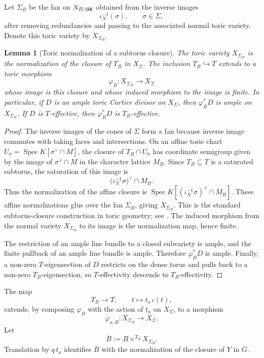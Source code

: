 \documentclass[10pt,a4paper]{amsart}
\theoremstyle{plain}
\newtheorem{lemma}[theorem]{Lemma}
\theoremstyle{plain}
\numberwithin{equation}{section}
\begin{document}
Let \(\Sigma_B\) be the fan on \(N_{B,\BR}\) obtained from the inverse images
\[
\iota_N^{-1}(\sigma),\qquad \sigma\in\Sigma,
\]
after removing redundancies and passing to the associated normal toric
variety.  Denote this toric variety by \(X_{\Sigma_B}\).

\begin{lemma}[Toric normalization of a subtorus closure]
	\label{lem:subtorus-toric-normalization}
	The toric variety \(X_{\Sigma_B}\) is the normalization of the closure of
	\(T_B\) in \(X_\Sigma\).  The inclusion \(T_B\hookrightarrow T\) extends to a
	toric morphism
	\[
	\varphi_B:X_{\Sigma_B}\longrightarrow X_\Sigma
	\]
	whose image is this closure and whose induced morphism to the image is finite.
	In particular, if \(D\) is an ample toric Cartier divisor on \(X_\Sigma\), then
	\(\varphi_B^*D\) is ample on \(X_{\Sigma_B}\).  If \(D\) is \(T\)-effective,
	then \(\varphi_B^*D\) is \(T_B\)-effective.
\end{lemma}

\begin{proof}
	The inverse images of the cones of \(\Sigma\) form a fan because inverse image
	commutes with taking faces and intersections.  On an affine toric chart
	\(U_\sigma=\operatorname{Spec} K[\sigma^\vee\cap M]\), the closure of
	\(T_B\cap U_\sigma\) has coordinate semigroup given by the image of
	\(\sigma^\vee\cap M\) in the character lattice \(M_B\).  Since \(T_B\subseteq T\)
	is a saturated subtorus, the saturation of this image is
	\[
	\bigl(\iota_N^{-1}\sigma\bigr)^\vee\cap M_B .
	\]
	Thus the normalization of the affine closure is
	\(\operatorname{Spec} K[(\iota_N^{-1}\sigma)^\vee\cap M_B]\).  These affine
	normalizations glue over the fan \(\Sigma_B\), giving \(X_{\Sigma_B}\).  This is
	the standard subtorus-closure construction in toric geometry; see
	\cite[Section 1.4]{WF}.  The induced morphism from the normal variety
	\(X_{\Sigma_B}\) to its image is the normalization map, hence finite.
	
	The restriction of an ample line bundle to a closed subvariety is ample, and
	the finite pullback of an ample line bundle is ample.  Therefore
	\(\varphi_B^*D\) is ample.  Finally, a non-zero \(T\)-eigensection of \(D\)
	restricts on the dense torus and pulls back to a non-zero \(T_B\)-eigensection,
	so \(T\)-effectivity descends to \(T_B\)-effectivity.
\end{proof}

The map
\[
T_B\longrightarrow T,\qquad t\longmapsto t_a\,\iota(t),
\]
extends, by composing \(\varphi_B\) with the action of \(t_a\) on \(X_\Sigma\),
to a morphism
\[
\varphi_{a,B}:X_{\Sigma_B}\longrightarrow X_\Sigma .
\]
Let
\[
\overline B:=B\times^{T_B}X_{\Sigma_B}.
\]
Translation by \(q\,t_a\) identifies \(\overline B\) with the normalization of
the closure of \(Y\) in \(\overline G\).
\end{document}
